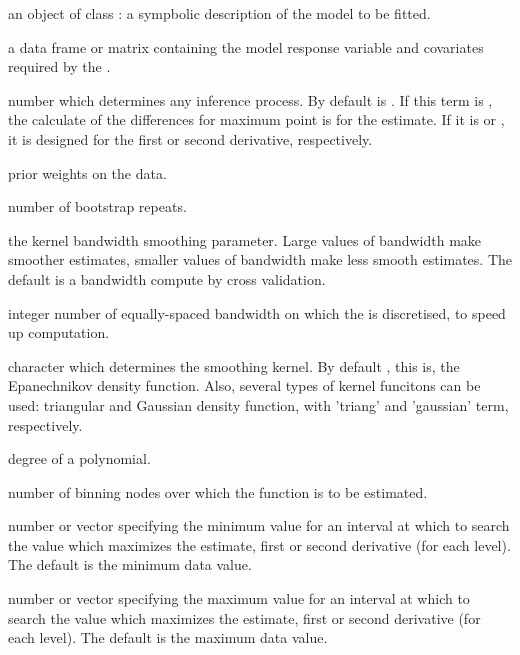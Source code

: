 \begin{Arguments}
\begin{ldescription}
\item[\code{formula}] an object of class : a sympbolic description of the model to be fitted.
 
\item[\code{data}] a data frame or matrix containing the model response variable and covariates required by the .
 
\item[\code{der}] number which determines any inference process. By default  is . If this term is , the calculate of the differences for maximum point is for the estimate. If it is  or , it is designed for the first or second derivative, respectively.

\item[\code{weights}] prior weights on the data.

\item[\code{nboot}] number of bootstrap repeats.

\item[\code{h}] the kernel bandwidth smoothing parameter. Large values of bandwidth make smoother estimates, smaller values of bandwidth make less smooth estimates. The default is a bandwidth compute by cross validation.

\item[\code{nh}] integer number of equally-spaced bandwidth on which the  is discretised, to speed up computation.

\item[\code{kernel}] character which determines the smoothing kernel. By default , this is, the Epanechnikov density function. Also, several types of kernel funcitons can be used:  triangular and Gaussian density function, with 'triang' and 'gaussian' term, respectively.
 
\item[\code{p}] degree of a polynomial.

\item[\code{kbin}] number of binning nodes over which the function is to be estimated.

\item[\code{rankl}] number or vector specifying the minimum value for an interval at which to search the  value which maximizes the estimate, first or second derivative  (for each level). The default is the minimum data value.

\item[\code{ranku}] number or vector specifying the maximum value for an interval at which to search the  value which maximizes the estimate, first or second derivative  (for each level). The default is the maximum data value.
\end{ldescription}
\end{Arguments}
